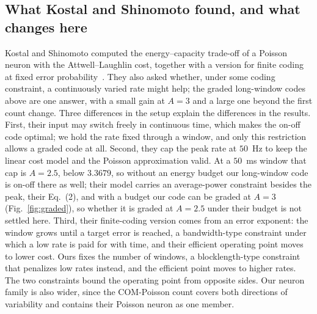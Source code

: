 \documentclass[journal]{IEEEtran}
\begin{document}
\subsection{What Kostal and Shinomoto found, and what changes here}
Kostal and Shinomoto computed the energy--capacity trade-off of a Poisson neuron with the Attwell--Laughlin cost, together with a version
for finite coding at fixed error probability~\cite{KostalShinomoto2016}. They also asked whether, under some coding constraint, a
continuously varied rate might help; the graded long-window codes above are one answer, with a small gain at $A = 3$ and a large one
beyond the first count change. Three differences in the setup
explain the differences in the results. First, their input may switch freely in continuous time, which makes the on-off code optimal; we
hold the rate fixed through a window, and only this restriction allows a graded code at all. Second, they cap the peak rate at $50$~Hz to
keep the linear cost model and the Poisson approximation valid. At a $50$~ms window that cap is $A = 2.5$, below $3.3679$, so without an
energy budget our long-window code is on-off there as well; their model carries an average-power constraint besides the peak, their
Eq.~(2), and with a budget
our code can be graded at $A = 3$ (Fig.~\ref{fig:graded}), so whether it is graded at $A = 2.5$ under their budget is not settled
here. Third, their finite-coding version comes from an error exponent: the window grows until a target error is reached, a
bandwidth-type constraint under which a low rate is paid for with time, and their efficient operating point moves to lower cost. Ours
fixes the number of windows, a blocklength-type constraint that penalizes low rates instead, and the efficient point moves to higher
rates. The two constraints bound the operating point from opposite sides. Our neuron family is also wider, since the COM-Poisson count
covers both directions of variability and contains their Poisson neuron as one member.
\end{document}
